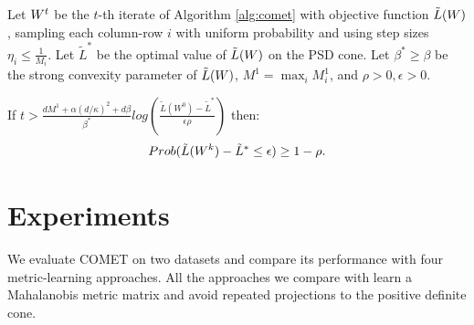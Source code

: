 \documentclass{article}
\begin{document}
\begin{theorem}
Let ${W}^t$ be the $t$-th iterate of Algorithm \ref{alg:comet} with objective function $\tilde{L}({W})$, sampling each column-row $i$ with uniform probability and using step sizes $\eta_i \leq \frac{1}{M_i}$. Let $\tilde{L}^*$ be the optimal value of $\tilde{L}({W})$ on the PSD cone. Let $\beta^* \geq \beta$ be the strong convexity parameter of $\tilde{L}({W})$, $M^1 = \max_i M^1_i$, and $\rho >0, \epsilon>0$.

If $t > \frac{d M^1 + \alpha (d/\kappa)^2 + d\beta}{\beta^*} log \left( \frac{\tilde{L}(W^0) - \tilde{L}^*}{\epsilon \rho}\right)$ then: $$Prob(\tilde{L}({W}^k) - \tilde{L}^* \leq \epsilon) \geq 1-\rho.$$
\end{theorem}


\section{Experiments}
We evaluate COMET on two datasets and compare its performance with four metric-learning approaches. All the approaches we compare with learn a Mahalanobis metric matrix and avoid repeated projections to the positive definite cone. 
\end{document}
